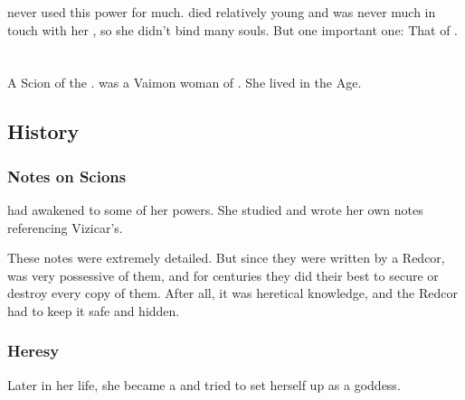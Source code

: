 \Delphine{} never used this power for much. 
\Delphine{} died relatively young and was never much in touch with her \carcer, so she didn't bind many souls. 
But  one important one: 
That of \Eryal. 















\section{\Iolivine}
\index{\Iolivine}
A Scion of the  . 
\Iolivine{} was a Vaimon woman of \ClanRedcor. 
She lived in the \Ortaican{} Age. 









\subsection{History}





\subsubsection{Notes on Scions}
\Iolivine{} had awakened to some of her powers. 
She studied  and wrote her own notes referencing Vizicar's. 

These notes were extremely detailed. 
But since they were written by a Redcor, \ClanRedcor was very possessive of them, and for centuries they did their best to secure or destroy every copy of them. 
After all, it was heretical knowledge, and the Redcor had to keep it safe and hidden. 





\subsubsection{Heresy}
Later in her life, she became a  and tried to set herself up as a goddess. 





